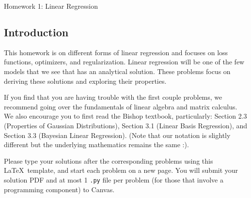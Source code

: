 \documentclass[submit]{harvardml}
\begin{document}
\begin{center}
{\Large Homework 1: Linear Regression}\\
\end{center}



\subsection*{Introduction}
This homework is on different forms of linear regression and focuses
on loss functions, optimizers, and regularization. Linear regression 
will be one of the few models that we see that has an analytical solution.
These problems focus on deriving these solutions and exploring their 
properties. 

If you find that you are having trouble with the first couple
problems, we recommend going over the fundamentals of linear algebra
and matrix calculus. We also encourage you to first read the Bishop
textbook, particularly: Section 2.3 (Properties of Gaussian
Distributions), Section 3.1 (Linear Basis Regression), and Section 3.3
(Bayesian Linear Regression). (Note that our notation is slightly different but
the underlying mathematics remains the same :).

Please type your solutions after the corresponding problems using this \LaTeX\ template, and start each problem on a new page. You will submit your solution PDF and at most 1 \texttt{.py} file per problem
(for those that involve a programming component) to Canvas.\\

\pagebreak 
\end{document}
